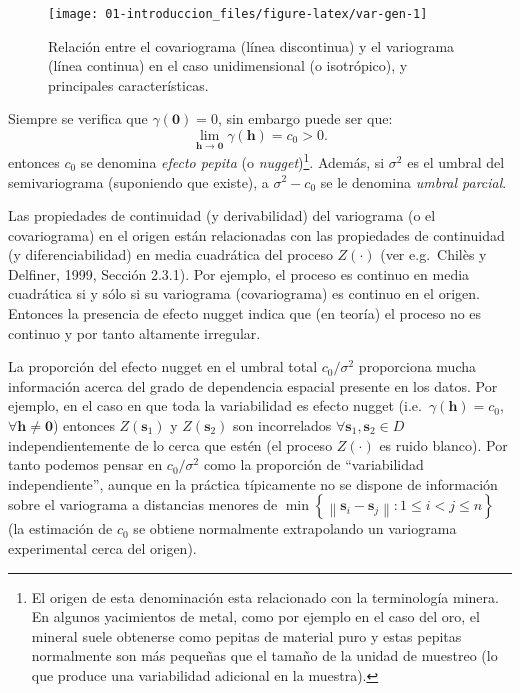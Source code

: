 \documentclass[
  spanish,
]{book}
\theoremstyle{break}
\begin{document}
\begin{figure}[!htb]

{\centering \texttt{[image: 01-introduccion\_files/figure-latex/var-gen-1]} 

}

\caption{Relación entre el covariograma (línea discontinua) y el variograma (línea continua) en el caso unidimensional (o isotrópico), y principales características.}\label{fig:var-gen}
\end{figure}

Siempre se verifica que \(\gamma (\mathbf{0})=0\), sin embargo puede ser que:
\[\lim \limits_{\mathbf{h}\rightarrow \mathbf{0}} \gamma(\mathbf{h}) = c_0 > 0.\]
entonces \(c_0\) se denomina \emph{efecto pepita} (o \emph{nugget})\footnote{El origen de esta denominación esta relacionado con la terminología minera. En algunos yacimientos de metal, como por ejemplo en el caso del oro, el mineral suele obtenerse como pepitas de material puro y estas pepitas normalmente son más pequeñas que el tamaño de la unidad de muestreo (lo que produce una variabilidad adicional en la muestra).}.
Además, si \(\sigma^{2}\) es el umbral del semivariograma (suponiendo que existe), a \(\sigma ^{2} -c_0\) se le denomina \emph{umbral parcial}.

Las propiedades de continuidad (y derivabilidad) del variograma (o el covariograma) en el origen están relacionadas con las propiedades de continuidad (y diferenciabilidad) en media cuadrática del proceso \(Z(\cdot)\) (ver e.g.~Chilès y Delfiner, 1999, Sección 2.3.1).
Por ejemplo, el proceso es continuo en media cuadrática si y sólo si su variograma (covariograma) es continuo en el origen. Entonces la presencia de efecto nugget indica que (en teoría) el proceso no es continuo y por tanto altamente irregular.

La proporción del efecto nugget en el umbral total \(c_0 /\sigma^{2}\) proporciona mucha información acerca del grado de dependencia espacial presente en los datos.
Por ejemplo, en el caso en que toda la variabilidad es efecto nugget (i.e.~\(\gamma (\mathbf{h})=c_0\), \(\forall \mathbf{h}\neq \mathbf{0}\)) entonces \(Z(\mathbf{s}_1)\) y \(Z(\mathbf{s}_2)\) son incorrelados \(\forall \mathbf{s}_1 ,\mathbf{s}_2 \in D\) independientemente de lo cerca que estén (el proceso \(Z(\cdot)\) es ruido blanco).
Por tanto podemos pensar en \(c_0 /\sigma^{2}\) como la proporción de ``variabilidad independiente'', aunque en la práctica típicamente no se dispone de información sobre el variograma a distancias menores de \(\min \left\{ \left\| \mathbf{s}_{i} -\mathbf{s}_{j} \right\| :1\leq i<j\leq n\right\}\) (la estimación de \(c_0\) se obtiene normalmente extrapolando un variograma experimental cerca del origen).
\end{document}
